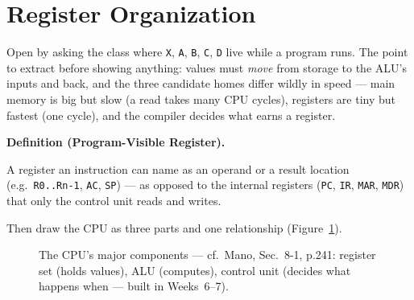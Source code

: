 \documentclass[11pt]{article}
\newenvironment{definitionbox}[1]{%
  \par\noindent\textbf{Definition (#1).}\ \itshape
}{\par\vspace{0.3em}}
\begin{document}
\section{Register Organization}

Open by asking the class where \texttt{X}, \texttt{A}, \texttt{B}, \texttt{C}, \texttt{D} live while a program runs. The point to extract before showing anything: values must \emph{move} from storage to the ALU's inputs and back, and the three candidate homes differ wildly in speed --- main memory is big but slow (a read takes many CPU cycles), registers are tiny but fastest (one cycle), and the compiler decides what earns a register.

\begin{definitionbox}{Program-Visible Register}
A register an instruction can name as an operand or a result location (e.g.\ \texttt{R0..Rn-1}, \texttt{AC}, \texttt{SP}) --- as opposed to the internal registers (\texttt{PC}, \texttt{IR}, \texttt{MAR}, \texttt{MDR}) that only the control unit reads and writes.
\end{definitionbox}

Then draw the CPU as three parts and one relationship (Figure~\ref{fig:cpu-components}).

\begin{figure}[h]
  \centering
  \caption{The CPU's major components --- cf.\ Mano, Sec.~8-1, p.241: register set (holds values), ALU (computes), control unit (decides what happens when --- built in Weeks~6--7).}
  \label{fig:cpu-components}
\end{figure}
\end{document}
